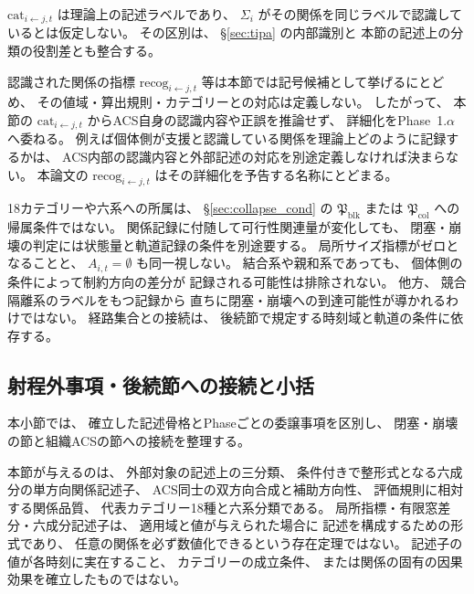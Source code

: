 \begin{remark}[カテゴリーと認識された関係性]
\label{rem:recognized_relation_category}
$\mathrm{cat}_{i\leftarrow j,t}$ は理論上の記述ラベルであり、
$\Sigma_i$ がその関係を同じラベルで認識しているとは仮定しない。
その区別は、
\S\ref{sec:tipa} の内部識別と
本節の記述上の分類の役割差とも整合する。

認識された関係の指標 $\mathrm{recog}_{i\leftarrow j,t}$ 等は本節では記号候補として挙げるにとどめ、
その値域・算出規則・カテゴリーとの対応は定義しない。
したがって、
本節の $\mathrm{cat}_{i\leftarrow j,t}$ からACS自身の認識内容や正誤を推論せず、
詳細化をPhase~1.$\alpha$へ委ねる。
例えば個体側が支援と認識している関係を理論上どのように記録するかは、
ACS内部の認識内容と外部記述の対応を別途定義しなければ決まらない。
本論文の $\mathrm{recog}_{i\leftarrow j,t}$ はその詳細化を予告する名称にとどまる。
\end{remark}

\begin{remark}
\label{rem:categories_to_sec7}
18カテゴリーや六系への所属は、
\S\ref{sec:collapse_cond} の
$\mathfrak{P}_{\mathrm{blk}}$ または $\mathfrak{P}_{\mathrm{col}}$ への帰属条件ではない。
関係記録に付随して可行性関連量が変化しても、
閉塞・崩壊の判定には状態量と軌道記録の条件を別途要する。
局所サイズ指標がゼロとなることと、
$A_{i,t}=\emptyset$ も同一視しない。
結合系や親和系であっても、
個体側の条件によって制約方向の差分が
記録される可能性は排除されない。
他方、
競合隔離系のラベルをもつ記録から
直ちに閉塞・崩壊への到達可能性が導かれるわけではない。
経路集合との接続は、
後続節で規定する時刻域と軌道の条件に依存する。
\end{remark}

\subsection{射程外事項・後続節への接続と小括}
\label{subsec:rel_phase1a}

本小節では、
確立した記述骨格とPhaseごとの委譲事項を区別し、
閉塞・崩壊の節と組織ACSの節への接続を整理する。

\begin{remark}[本節で確立した最小構造]
\label{rem:sec6_established}
本節が与えるのは、
外部対象の記述上の三分類、
条件付きで整形式となる六成分の単方向関係記述子、
ACS同士の双方向合成と補助方向性、
評価規則に相対する関係品質、
代表カテゴリー18種と六系分類である。
局所指標・有限窓差分・六成分記述子は、
適用域と値が与えられた場合に
記述を構成するための形式であり、
任意の関係を必ず数値化できるという存在定理ではない。
記述子の値が各時刻に実在すること、
カテゴリーの成立条件、
または関係の固有の因果効果を確立したものではない。
\end{remark}

